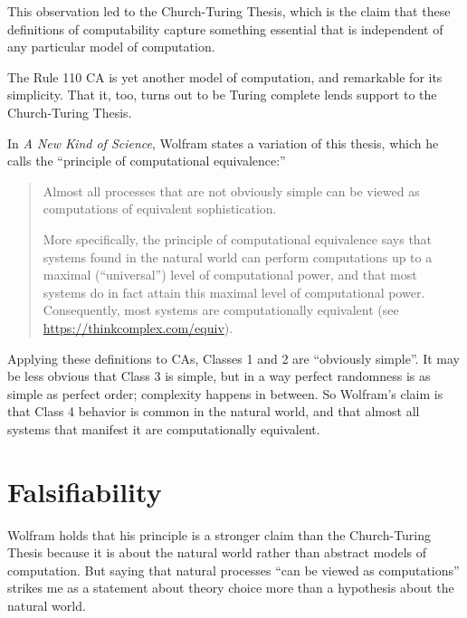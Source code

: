 \documentclass[12pt]{book}
\theoremstyle{exercise}
\begin{document}

This observation led to the Church-Turing Thesis, which is the claim that these definitions of computability capture something essential that is independent of any particular model of computation.

The Rule 110 CA is yet another model of computation, and remarkable
for its simplicity.  That it, too, turns out to be Turing complete lends
support to the Church-Turing Thesis.

In {\em A New Kind of Science}, Wolfram states a variation of this
thesis, which he calls the ``principle of computational equivalence:''


\begin{quote}
Almost all processes that are not obviously simple can be viewed as
computations of equivalent sophistication.

More specifically, the principle of computational equivalence says
that systems found in the natural world can perform computations up to
a maximal (``universal'') level of computational power, and that most
systems do in fact attain this maximal level of computational
power. Consequently, most systems are computationally
equivalent (see
  \url{https://thinkcomplex.com/equiv}).
\end{quote}

Applying these definitions to CAs, Classes 1 and 2 are ``obviously
simple''.  It may be less obvious that Class 3 is simple, but in a way
perfect randomness is as simple as perfect order; complexity happens
in between.  So Wolfram's claim is that Class 4 behavior is common in
the natural world, and that almost all systems that manifest it
are computationally equivalent.



\section{Falsifiability}

Wolfram holds that his principle is a stronger claim than the
Church-Turing Thesis because it is about the natural world rather
than abstract models of computation.  But saying that natural processes
``can be viewed as computations'' strikes me as a statement about
theory choice more than a hypothesis about the natural world.
\end{document}
